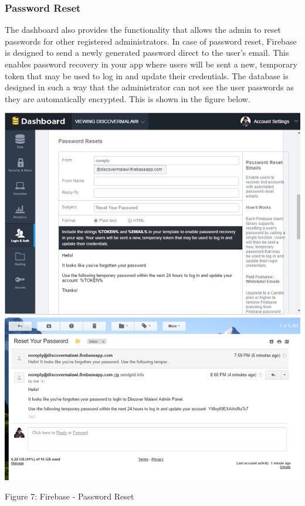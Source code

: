 \subsubsection{Password Reset}
The dashboard also provides the functionality that allows the admin to reset passwords for other registered administrators. In case of password reset, Firebase is designed to send a newly generated password direct to the user’s email. This enables password recovery in your app where users will be sent a new, temporary token that may be used to log in and update their credentials. The database is designed in such a way that the administrator can not see the user passwords as they are automatically encrypted. This is shown in the figure below. 
\begin{center}    
	\includegraphics{img/passwd.png}
	\includegraphics{img/passreset.png}
\end{center}
\begin{center}
	Figure 7: Firebase - Password Reset
\end{center}

